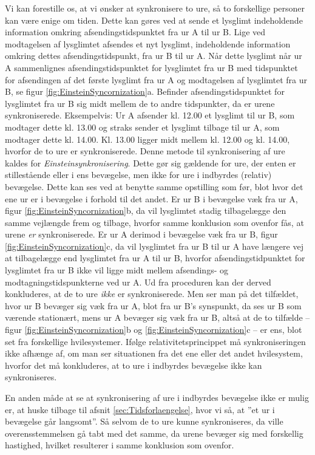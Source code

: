 Vi kan forestille os, at vi ønsker at synkronisere to ure, så to forskellige personer kan være enige om tiden. Dette kan gøres ved at sende et lysglimt indeholdende information omkring afsendingstidspunktet fra ur A til ur B. Lige ved modtagelsen af lysglimtet afsendes et nyt lysglimt, indeholdende information omkring dettes afsendingstidspunkt, fra ur B til ur A. Når dette lysglimt når ur A sammenlignes afsendingstidspunktet for lysglimtet fra ur B med tidspunktet for afsendingen af det første lysglimt fra ur A og modtagelsen af lysglimtet fra ur B, se figur \ref{fig:EinsteinSyncornization}a. Befinder afsendingstidspunktet for lysglimtet fra ur B sig midt mellem de to andre tidspunkter, da er urene synkroniserede. Eksempelvis: Ur A afsender kl. 12.00 et lysglimt til ur B, som modtager dette kl. 13.00 og straks sender et lysglimt tilbage til ur A, som modtager dette kl. 14.00. Kl. 13.00 ligger midt mellem kl. 12.00 og kl. 14.00, hvorfor de to ure er synkroniserede. Denne metode til synkronisering af ure kaldes for \textit{Einsteinsynkronisering}. Dette gør sig gældende for ure, der enten er stillestående eller i ens bevægelse, men ikke for ure i indbyrdes (relativ) bevægelse. Dette kan ses ved at benytte samme opstilling som før, blot hvor det ene ur er i bevægelse i forhold til det andet. Er ur B i bevægelse væk fra ur A, figur \ref{fig:EinsteinSyncornization}b, da vil lysglimtet stadig tilbagelægge den samme vejlængde frem og tilbage, hvorfor samme konklusion som ovenfor fås, at urene \emph{er} synkroniserede. Er ur A derimod i bevægelse væk fra ur B, figur \ref{fig:EinsteinSyncornization}c, da vil lysglimtet fra ur B til ur A have længere vej at tilbagelægge end lysglimtet fra ur A til ur B, hvorfor afsendingstidpunktet for lysglimtet fra ur B ikke vil ligge midt mellem afsendings- og modtagningstidspunkterne ved ur A. Ud fra proceduren kan der derved konkluderes, at de to ure \emph{ikke} er synkroniserede. Men ser man på det tilfældet, hvor ur B bevæger sig væk fra ur A, blot fra ur B's synspunkt, da ses ur B som værende stationært, mens ur A bevæger sig væk fra ur B, altså at de to tilfælde -- figur \ref{fig:EinsteinSyncornization}b og \ref{fig:EinsteinSyncornization}c -- er ens, blot set fra forskellige hvilesystemer. Ifølge relativitetsprincippet må synkroniseringen ikke afhænge af, om man ser situationen fra det ene eller det andet hvilesystem, hvorfor det må konkluderes, at to ure i indbyrdes bevægelse ikke kan synkroniseres.

En anden måde at se at synkronisering af ure i indbyrdes bevægelse ikke er mulig er, at huske tilbage til afsnit \ref{sec:Tidsforlaengelse}, hvor vi så, at ''et ur i bevægelse går langsomt''. Så selvom de to ure kunne synkroniseres, da ville overensstemmelsen gå tabt med det samme, da urene bevæger sig med forskellig hastighed, hvilket resulterer i samme konklusion som ovenfor.


